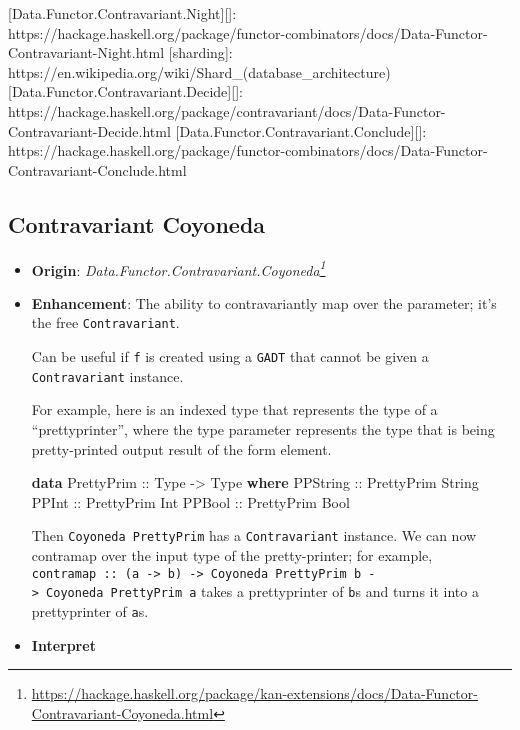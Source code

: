 \documentclass[]{article}
\newenvironment{Shaded}{}{}
\newcommand{\DataTypeTok}[1]{\textcolor[rgb]{0.56,0.13,0.00}{#1}}
\newcommand{\KeywordTok}[1]{\textcolor[rgb]{0.00,0.44,0.13}{\textbf{#1}}}
\newcommand{\OtherTok}[1]{\textcolor[rgb]{0.00,0.44,0.13}{#1}}
\renewcommand{\href}[2]{#2\footnote{\url{#1}}}
\begin{document}
{[}Data.Functor.Contravariant.Night{]}{[}{]}:
https://hackage.haskell.org/package/functor-combinators/docs/Data-Functor-Contravariant-Night.html
{[}sharding{]}: https://en.wikipedia.org/wiki/Shard\_(database\_architecture)
{[}Data.Functor.Contravariant.Decide{]}{[}{]}:
https://hackage.haskell.org/package/contravariant/docs/Data-Functor-Contravariant-Decide.html
{[}Data.Functor.Contravariant.Conclude{]}{[}{]}:
https://hackage.haskell.org/package/functor-combinators/docs/Data-Functor-Contravariant-Conclude.html

\hypertarget{contravariant-coyoneda}{%
\subsection{Contravariant Coyoneda}\label{contravariant-coyoneda}}

\begin{itemize}
\item
  \textbf{Origin}:
  \emph{\href{https://hackage.haskell.org/package/kan-extensions/docs/Data-Functor-Contravariant-Coyoneda.html}{Data.Functor.Contravariant.Coyoneda}}
\item
  \textbf{Enhancement}: The ability to contravariantly map over the parameter;
  it's the free \texttt{Contravariant}.

  Can be useful if \texttt{f} is created using a \texttt{GADT} that cannot be
  given a \texttt{Contravariant} instance.

  For example, here is an indexed type that represents the type of a
  ``prettyprinter'', where the type parameter represents the type that is being
  pretty-printed output result of the form element.

\begin{Shaded}
\begin{Highlighting}[]
\KeywordTok{data} \DataTypeTok{PrettyPrim}\OtherTok{ ::} \DataTypeTok{Type} \OtherTok{{-}>} \DataTypeTok{Type} \KeywordTok{where}
    \DataTypeTok{PPString}\OtherTok{  ::} \DataTypeTok{PrettyPrim} \DataTypeTok{String}
    \DataTypeTok{PPInt}\OtherTok{     ::} \DataTypeTok{PrettyPrim} \DataTypeTok{Int}
    \DataTypeTok{PPBool}\OtherTok{    ::} \DataTypeTok{PrettyPrim} \DataTypeTok{Bool}
\end{Highlighting}
\end{Shaded}

  Then \texttt{Coyoneda\ PrettyPrim} has a \texttt{Contravariant} instance. We
  can now contramap over the input type of the pretty-printer; for example,
  \texttt{contramap\ ::\ (a\ -\textgreater{}\ b)\ -\textgreater{}\ Coyoneda\ PrettyPrim\ b\ -\textgreater{}\ Coyoneda\ PrettyPrim\ a}
  takes a prettyprinter of \texttt{b}s and turns it into a prettyprinter of
  \texttt{a}s.
\item
  \textbf{Interpret}


\end{itemize}
\end{document}
